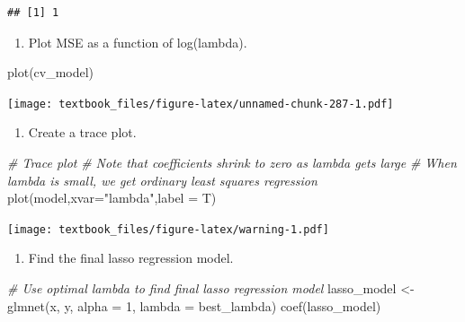 \documentclass[
  11pt,
]{book}
\newenvironment{Shaded}{\begin{snugshade}}{\end{snugshade}}
\newcommand{\AttributeTok}[1]{\textcolor[rgb]{0.77,0.63,0.00}{#1}}
\newcommand{\CommentTok}[1]{\textcolor[rgb]{0.56,0.35,0.01}{\textit{#1}}}
\newcommand{\DecValTok}[1]{\textcolor[rgb]{0.00,0.00,0.81}{#1}}
\newcommand{\FunctionTok}[1]{\textcolor[rgb]{0.00,0.00,0.00}{#1}}
\newcommand{\NormalTok}[1]{#1}
\newcommand{\OtherTok}[1]{\textcolor[rgb]{0.56,0.35,0.01}{#1}}
\newcommand{\StringTok}[1]{\textcolor[rgb]{0.31,0.60,0.02}{#1}}
\providecommand{\tightlist}{%
  \setlength{\itemsep}{0pt}\setlength{\parskip}{0pt}}
\theoremstyle{definition}
\theoremstyle{definition}
\theoremstyle{definition}
\theoremstyle{definition}
\theoremstyle{remark}
\begin{document}
\begin{verbatim}
## [1] 1
\end{verbatim}

\begin{enumerate}
\def\labelenumi{(\alph{enumi})}
\setcounter{enumi}{1}
\tightlist
\item
  Plot MSE as a function of log(lambda).
\end{enumerate}

\begin{Shaded}
\begin{Highlighting}[]
\FunctionTok{plot}\NormalTok{(cv\_model)}
\end{Highlighting}
\end{Shaded}

\texttt{[image: textbook\_files/figure-latex/unnamed-chunk-287-1.pdf]}

\newpage

\begin{enumerate}
\def\labelenumi{(\alph{enumi})}
\setcounter{enumi}{2}
\tightlist
\item
  Create a trace plot.
\end{enumerate}

\begin{Shaded}
\begin{Highlighting}[]
\CommentTok{\# Trace plot}
\CommentTok{\# Note that coefficients shrink to zero as lambda gets large}
\CommentTok{\# When lambda is small, we get ordinary least squares regression}
\FunctionTok{plot}\NormalTok{(model,}\AttributeTok{xvar=}\StringTok{"lambda"}\NormalTok{,}\AttributeTok{label =}\NormalTok{ T) }
\end{Highlighting}
\end{Shaded}

\texttt{[image: textbook\_files/figure-latex/warning-1.pdf]}

\begin{enumerate}
\def\labelenumi{(\alph{enumi})}
\setcounter{enumi}{3}
\tightlist
\item
  Find the final lasso regression model.
\end{enumerate}

\begin{Shaded}
\begin{Highlighting}[]
\CommentTok{\# Use optimal lambda to find final lasso regression model}
\NormalTok{lasso\_model }\OtherTok{\textless{}{-}} \FunctionTok{glmnet}\NormalTok{(x, y, }\AttributeTok{alpha =} \DecValTok{1}\NormalTok{, }\AttributeTok{lambda =}\NormalTok{ best\_lambda)}
\FunctionTok{coef}\NormalTok{(lasso\_model)}
\end{Highlighting}
\end{Shaded}
\end{document}
